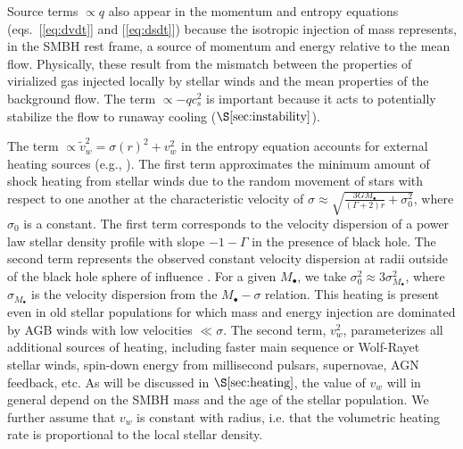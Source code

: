 \documentclass[usenatbib,fleqn]{mn2e}
\newcommand{\vw}{\tilde{v}_{w}}
\newcommand{\Mbh}[1][]{M_{\bullet#1}}
\begin{document}
Source terms $\propto q$ also appear in the momentum and entropy
equations (eqs.~[\ref{eq:dvdt}] and [\ref{eq:dsdt}]) because the isotropic injection of mass represents, in the SMBH rest frame, a source of momentum
and energy relative to the mean flow.  Physically, these result from
the mismatch between the properties of virialized gas injected locally
by stellar winds and the mean properties of the background flow.  The
term $\propto -q c_{s}^{2}$ is important because it acts to potentially stabilize the flow to runaway cooling ($\S\ref{sec:instability}$).

The term $\propto \vw^2 = \sigma(r)^2+v_{w}^2$ in the entropy equation
accounts for external heating sources (e.g.,
\citealt{ShcherbakovWong+:2014a}).  The first term approximates the
minimum amount of shock heating from stellar winds due to the random
movement of stars with respect to one another at the characteristic
velocity of $\sigma \approx \sqrt{\frac{3 G \Mbh}{(\Gamma+2)
    r}+\sigma_0^2}$, where $\sigma_0$ is a constant. The first term
corresponds to the velocity dispersion of a power law stellar density
profile with slope $-1-\Gamma$ in the presence of black hole. The
second term represents the observed constant velocity dispersion at
radii outside of the black hole sphere of influence
\citep{ChaeBernardi+:2014a}. For a given $\Mbh$, we take
$\sigma_0^2\approx 3 \sigma_{\Mbh}^2$, where $\sigma_{\Mbh}$ is the
velocity dispersion from the \citet{McConnellMa+:2011a} $\Mbh-\sigma$
relation.  This heating is present even in old stellar populations for
which mass and energy injection are dominated by AGB winds with low
velocities $\ll \sigma$.  The second term, $v_{w}^{2}$, parameterizes
all additional sources of heating, including faster main sequence or
Wolf-Rayet stellar winds, spin-down energy from millisecond pulsars,
supernovae, AGN feedback, etc.  As will be discussed in
$\S\ref{sec:heating}$, the value of $v_{w}$ will in general depend on
the SMBH mass and the age of the stellar population.  We further
assume that $v_w$ is constant with radius, i.e. that the volumetric
heating rate is proportional to the local stellar density.
\end{document}
